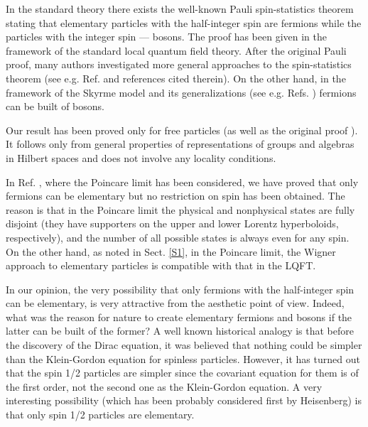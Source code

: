 \documentclass[a4paper,12pt]{article}%
\begin{document}
In the standard theory there exists the well-known Pauli 
spin-statistics theorem \cite{Pauli} stating that 
elementary particles with the half-integer spin are 
fermions while the particles with the integer spin --- 
bosons. The proof has been given in the framework of the 
standard local quantum field theory. After the original 
Pauli proof, many authors investigated more general 
approaches to the spin-statistics theorem (see e.g. Ref. 
\cite{Kuckert} and references cited therein). On the 
other hand, in the framework of the Skyrme model 
\cite{Skyrme} and its generalizations (see e.g. 
Refs. \cite{Zahed}) fermions can be built of bosons.

Our result has been proved only for free particles (as well
as the original proof \cite{Pauli}). It follows only from 
general properties of representations of groups and algebras
in Hilbert spaces and does not involve any locality
conditions.

In Ref. \cite{hep}, where the Poincare limit has been
considered, we have proved that only fermions can be
elementary but no restriction on spin has been 
obtained. The reason is that in the Poincare limit
the physical and nonphysical states are fully disjoint
(they have supporters on the upper and lower Lorentz
hyperboloids, respectively), and the number of all
possible states is always even for any spin. On the other
hand, as noted in Sect. \ref{S1}, in the Poincare limit,
the Wigner approach to elementary particles is
compatible with that in the LQFT.
 
In our opinion, the very possibility that only fermions 
with the half-integer spin can be elementary, is very 
attractive from the
aesthetic point of view. Indeed, what was the reason for
nature to create elementary fermions and bosons if the 
latter can be built of the former? A well known
historical analogy is that before the discovery of
the Dirac equation, it was believed that nothing could
be simpler than the Klein-Gordon equation for spinless
particles. However, it has turned out that the spin 1/2
particles are simpler since the covariant equation
for them is of the first order, not the second one as the
Klein-Gordon equation. A very interesting possibility
(which has been probably considered first by Heisenberg) is 
that only spin 1/2 particles are elementary.
\end{document}
